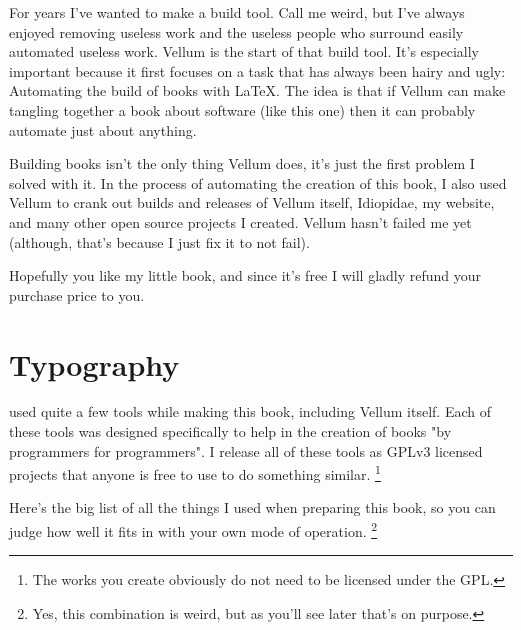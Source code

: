 For years I've wanted to make a build tool.  Call me weird, but I've always
enjoyed removing useless work and the useless people who surround easily
automated useless work.  Vellum is the start of that build tool.  It's
especially important because it first focuses on a task that has always been
hairy and ugly:  Automating the build of books with LaTeX.  The idea is that if
Vellum can make tangling together a book about software (like this one) then it
can probably automate just about anything.

Building books isn't the only thing Vellum does, it's just the first problem I
solved with it.  In the process of automating the creation of this book, I also
used Vellum to crank out builds and releases of Vellum itself, Idiopidae, my
website, and many other open source projects I created.  Vellum hasn't failed me
yet (although, that's because I just fix it to not fail).

Hopefully you like my little book, and since it's free I will gladly refund your
purchase price to you.



\chapter*{Typography}

 used quite a few tools while making this book, including Vellum
itself.  Each of these tools was designed specifically to help in the creation
of books "by programmers for programmers".  I release all of these tools as
GPLv3 licensed projects that anyone is free to use to do something similar.
\footnote{The works you create obviously do not need to be licensed under the
    GPL.}

Here's the big list of all the things I used when preparing this book, so you
can judge how well it fits in with your own mode of operation. \footnote{Yes,
this combination is weird, but as you'll see later that's on purpose.}

